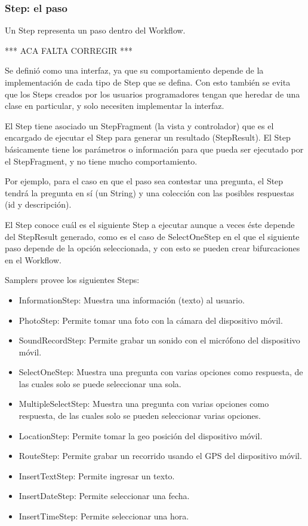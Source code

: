 \subsubsection{Step: el paso}
Un Step representa un paso dentro del Workflow.

*** ACA FALTA CORREGIR  ***


Se definió como una interfaz, ya que su comportamiento depende de la implementación de cada tipo de Step que se defina. Con esto también se evita que los Steps creados por los usuarios programadores tengan que heredar de una clase en particular, y solo necesiten implementar la interfaz.

El Step tiene asociado un StepFragment (la vista y controlador) que es el encargado de ejecutar el Step para generar un resultado (StepResult). El Step básicamente tiene los parámetros o información para que pueda ser ejecutado por el StepFragment, y no tiene mucho comportamiento.

Por ejemplo, para el caso en que el paso sea contestar una pregunta, el Step tendrá la pregunta en sí (un String) y una colección con las posibles respuestas (id y descripción).

El Step conoce cuál es el siguiente Step a ejecutar aunque a veces éste depende del StepResult generado, como es el caso de SelectOneStep en el que el siguiente paso depende de la opción seleccionada, y con esto se pueden crear bifurcaciones en el Workflow.

Samplers provee los siguientes Steps:
\begin{itemize}
	\item InformationStep: Muestra una información (texto) al usuario.
	\item PhotoStep: Permite tomar una foto con la cámara del dispositivo móvil.
	\item SoundRecordStep: Permite grabar un sonido con el micrófono del dispositivo móvil.
	\item SelectOneStep: Muestra una pregunta con varias opciones como respuesta, de las cuales solo se puede seleccionar una sola.
	\item MultipleSelectStep: Muestra una pregunta con varias opciones como respuesta, de las cuales solo se pueden seleccionar varias opciones.
	\item LocationStep: Permite tomar la geo posición del dispositivo móvil.
	\item RouteStep: Permite grabar un recorrido usando el GPS del dispositivo móvil.
	\item InsertTextStep: Permite ingresar un texto.
	\item InsertDateStep: Permite seleccionar una fecha.
	\item InsertTimeStep: Permite seleccionar una hora.
\end{itemize}

